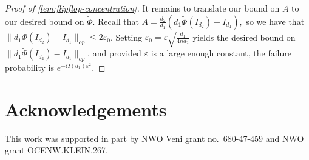 \documentclass[aos]{imsart}
\theoremstyle{definition}
\numberwithin{equation}{section}
\newcommand{\eps}{\varepsilon}
\begin{document}
\begin{appendix}
\begin{proof}[Proof of \cref{lem:flipflop-concentration}]
It remains to translate our bound on $A$ to our desired bound on $\tilde{\Phi}$. Recall that $A = \frac{d_2}{d_1} (d_1 \tilde{\Phi}(I_{d_2}) - I_{d_1}),$ so we have that $\|d_1 \tilde{\Phi}(I_{d_2}) - I_{d_1}\|_{op} \leq 2 \eps_0$. Setting $\eps_0 = \eps \sqrt{\frac{d_1}{4n d_2}}$ yields the desired bound on $\|d_1 \tilde{\Phi}(I_{d_2}) - I_{d_1}\|_{op}$, and provided $\eps$ is a large enough constant, the failure probability is $e^{ - \Omega(d_1) \eps^2}$.\end{proof}


\end{appendix}



\section*{Acknowledgements}
This work was supported in part by NWO Veni grant no.~680-47-459 and NWO grant OCENW.KLEIN.267.




\end{document}
